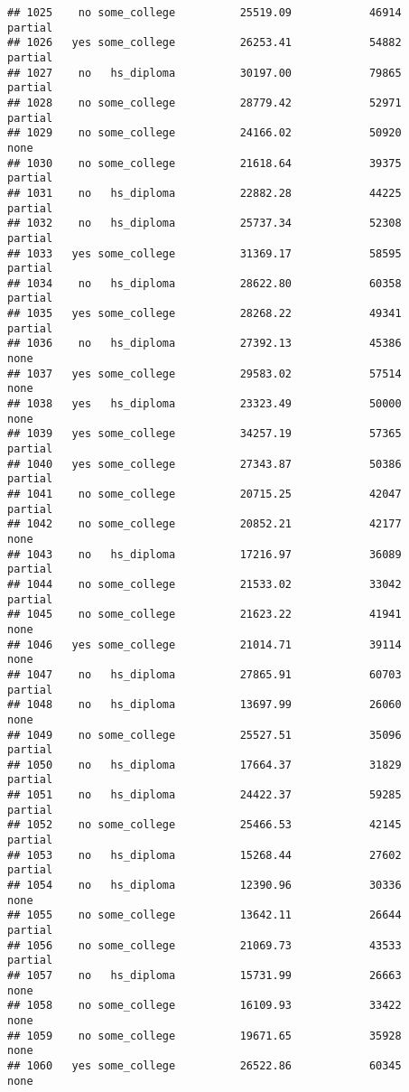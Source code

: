 \documentclass[
]{article}
\begin{document}
\begin{verbatim}
## 1025    no some_college          25519.09            46914     partial
## 1026   yes some_college          26253.41            54882     partial
## 1027    no   hs_diploma          30197.00            79865     partial
## 1028    no some_college          28779.42            52971     partial
## 1029    no some_college          24166.02            50920        none
## 1030    no some_college          21618.64            39375     partial
## 1031    no   hs_diploma          22882.28            44225     partial
## 1032    no   hs_diploma          25737.34            52308     partial
## 1033   yes some_college          31369.17            58595     partial
## 1034    no   hs_diploma          28622.80            60358     partial
## 1035   yes some_college          28268.22            49341     partial
## 1036    no   hs_diploma          27392.13            45386        none
## 1037   yes some_college          29583.02            57514        none
## 1038   yes   hs_diploma          23323.49            50000        none
## 1039   yes some_college          34257.19            57365     partial
## 1040   yes some_college          27343.87            50386     partial
## 1041    no some_college          20715.25            42047     partial
## 1042    no some_college          20852.21            42177        none
## 1043    no   hs_diploma          17216.97            36089     partial
## 1044    no some_college          21533.02            33042     partial
## 1045    no some_college          21623.22            41941        none
## 1046   yes some_college          21014.71            39114        none
## 1047    no   hs_diploma          27865.91            60703     partial
## 1048    no   hs_diploma          13697.99            26060        none
## 1049    no some_college          25527.51            35096     partial
## 1050    no   hs_diploma          17664.37            31829     partial
## 1051    no   hs_diploma          24422.37            59285     partial
## 1052    no some_college          25466.53            42145     partial
## 1053    no   hs_diploma          15268.44            27602     partial
## 1054    no   hs_diploma          12390.96            30336        none
## 1055    no some_college          13642.11            26644     partial
## 1056    no some_college          21069.73            43533     partial
## 1057    no   hs_diploma          15731.99            26663        none
## 1058    no some_college          16109.93            33422        none
## 1059    no some_college          19671.65            35928        none
## 1060   yes some_college          26522.86            60345        none

\end{verbatim}
\end{document}
